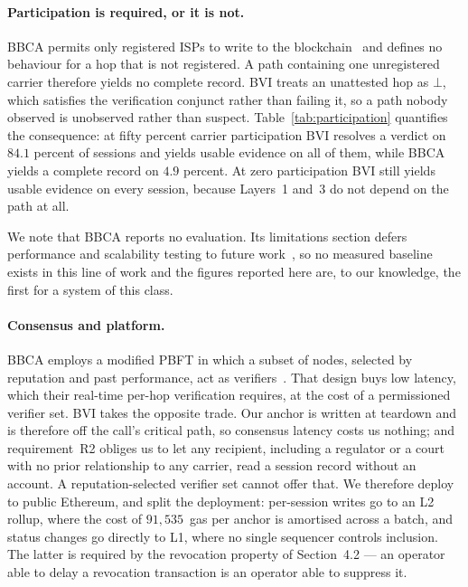 \paragraph{Participation is required, or it is not.}
BBCA permits only registered ISPs to write to the
blockchain~\cite[Sec.~III.A]{bbca} and defines no behaviour for a hop that is
not registered. A path containing one unregistered carrier therefore yields no
complete record. BVI treats an unattested hop as $\bot$, which satisfies the
verification conjunct rather than failing it, so a path nobody observed is
unobserved rather than suspect. Table~\ref{tab:participation} quantifies the
consequence: at fifty percent carrier participation BVI resolves a verdict on
$84.1$ percent of sessions and yields usable evidence on all of them, while
BBCA yields a complete record on $4.9$ percent. At zero participation BVI still
yields usable evidence on every session, because Layers~1 and~3 do not depend
on the path at all.

We note that BBCA reports no evaluation. Its limitations section defers
performance and scalability testing to future work~\cite[Sec.~IV]{bbca}, so no
measured baseline exists in this line of work and the figures reported here are,
to our knowledge, the first for a system of this class.



\paragraph{Consensus and platform.}
BBCA employs a modified PBFT in which a subset of nodes, selected by reputation
and past performance, act as verifiers~\cite[Sec.~III.A]{bbca}. That design
buys low latency, which their real-time per-hop verification requires, at the
cost of a permissioned verifier set. BVI takes the opposite trade. Our anchor
is written at teardown and is therefore off the call's critical path, so
consensus latency costs us nothing; and requirement~R2 obliges us to let any
recipient, including a regulator or a court with no prior relationship to any
carrier, read a session record without an account. A reputation-selected
verifier set cannot offer that. We therefore deploy to public Ethereum, and
split the deployment: per-session writes go to an L2 rollup, where the cost of
$91{,}535$~gas per anchor is amortised across a batch, and status changes go
directly to L1, where no single sequencer controls inclusion. The latter is
required by the revocation property of Section~4.2 --- an operator able to
delay a revocation transaction is an operator able to suppress it.


